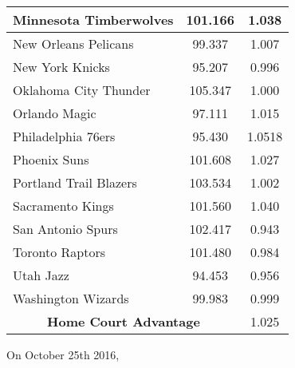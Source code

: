 \begin{table}[t]
\begin{tabular}{|l|c|c|}
		Minnesota Timberwolves & 101.166 & 1.038\\ \hline
		New Orleans Pelicans & 99.337 & 1.007\\ \hline
		New York Knicks & 95.207 & 0.996\\ \hline
		Oklahoma City Thunder & 105.347 & 1.000\\ \hline
		Orlando Magic & 97.111 & 1.015\\ \hline
		Philadelphia 76ers & 95.430 & 1.0518\\ \hline
		Phoenix Suns & 101.608 & 1.027\\ \hline
		Portland Trail Blazers & 103.534 & 1.002\\ \hline
		Sacramento Kings & 101.560 & 1.040\\ \hline
		San Antonio Spurs & 102.417 & 0.943\\ \hline
		Toronto Raptors & 101.480 & 0.984 \\ \hline
		Utah Jazz & 94.453 & 0.956\\ \hline
		Washington Wizards & 99.983 & 0.999\\ \hline
		\multicolumn{2}{|c|}{\textbf{Home Court Advantage}} & 1.025\\ \hline
	\end{tabular}
	\label{table:dc_141516}
\end{table}


On October 25th 2016,

